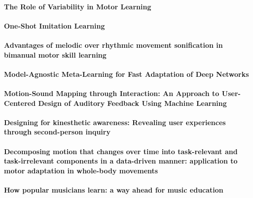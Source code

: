\documentclass[11pt]{article}
\begin{document}
\paragraph{The Role of Variability in Motor Learning} \citep{dhawale_role_2017}

\paragraph{One-Shot Imitation Learning} \citep{duan_one-shot_2017}

\paragraph{Advantages of melodic over rhythmic movement sonification in bimanual motor skill learning} \citep{dyer_advantages_2017}

\paragraph{Model-Agnostic Meta-Learning for Fast Adaptation of Deep Networks} \citep{finn_model-agnostic_2017}

\paragraph{Motion-Sound Mapping through Interaction: An Approach to User-Centered Design of Auditory Feedback Using Machine Learning} \citep{francoise_motion-sound_2018}

\paragraph{Designing for kinesthetic awareness: Revealing user experiences through second-person inquiry} \citep{francoise_designing_2017}

\paragraph{Decomposing motion that changes over time into task-relevant and task-irrelevant components in a data-driven manner: application to motor adaptation in whole-body movements} \citep{furuki_decomposing_2019}

\paragraph{How popular musicians learn: a way ahead for music education} \citep{green_how_2002}
\end{document}
